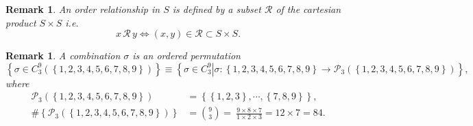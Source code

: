 \documentclass[aps,preprint]{revtex4}%
\newtheorem{remark}[theorem]{Remark}
\begin{document}
\begin{remark}
An \emph{order relationship} in $S$ is defined by a subset $\mathcal{R}$ of
the cartesian product $S\times S$ i.e.
\begin{equation}
x\,\mathcal{R\,}y\Leftrightarrow\left(  x,y\right)  \in\mathcal{R}\subset
S\times S.
\end{equation}

\end{remark}

\begin{remark}
A combination $\sigma$ is an ordered permutation
\begin{equation}
\left\{  \sigma\in C_{3}^{9}\left(  \left\{  1,2,3,4,5,6,7,8,9\right\}
\right)  \right\}  \equiv\left\{  \left.  \sigma\in C_{3}^{9}\right\vert
\sigma:\left\{  1,2,3,4,5,6,7,8,9\right\}  \rightarrow\mathcal{P}_{3}\left(
\left\{  1,2,3,4,5,6,7,8,9\right\}  \right)  \right\}  ,
\end{equation}
where%
\begin{align}
\mathcal{P}_{3}\left(  \left\{  1,2,3,4,5,6,7,8,9\right\}  \right)   &
=\left\{  \left\{  1,2,3\right\}  ,\cdots,\left\{  7,8,9\right\}  \right\}
,\\
\#\left\{  \mathcal{P}_{3}\left(  \left\{  1,2,3,4,5,6,7,8,9\right\}  \right)
\right\}   &  =\binom{9}{3}=\ \frac{9\times8\times7}{1\times2\times3}%
=12\times7=84.
\end{align}

\end{remark}
\end{document}
